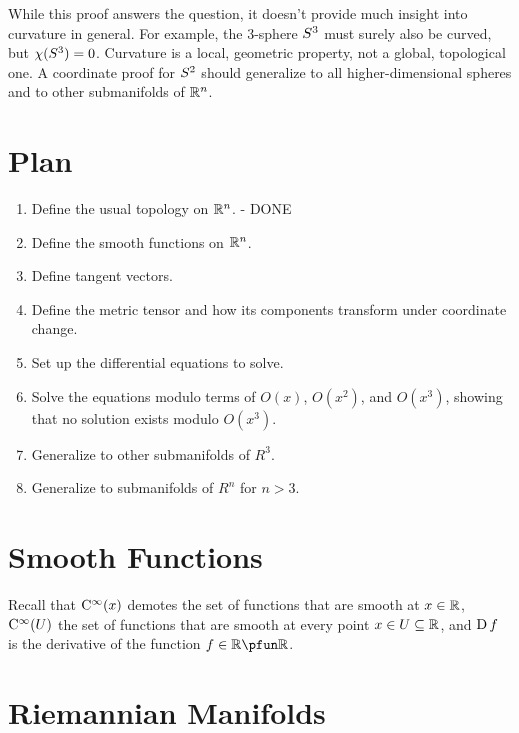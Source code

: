 \documentclass[11pt, oneside]{article}
\begin{document}
While this proof answers the question, it doesn't provide much insight into curvature in general.
For example, the 3-sphere $S^3$ must surely also be curved, but $\chi(S^3) = 0$.
Curvature is a local, geometric property, not a global, topological one.
A coordinate proof for $S^2$ should generalize to all higher-dimensional spheres and to other submanifolds of $\mathbb{R}^n$.

\section{Plan}

\begin{enumerate}

\item Define the usual topology on $\mathbb{R}^n$. - DONE

\item Define the smooth functions on $\mathbb{R}^n$.

\item Define tangent vectors.

\item Define the metric tensor and how its components transform under coordinate change.

\item Set up the differential equations to solve.

\item Solve the equations modulo terms of $O(x)$, $O(x^2)$, and $O(x^3)$, showing that no solution exists
modulo $O(x^3)$.

\item Generalize to other submanifolds of $R^3$.

\item Generalize to submanifolds of $R^n$ for $n > 3$.

\end{enumerate}

\section{Smooth Functions}

Recall that $\operatorname{C^{\infty}}(x)$ demotes the set of functions that are smooth at $x \in \mathbb{R}$, $\operatorname{C^{\infty}}(U)$ the set of functions that are smooth at
every point $x \in U \subseteq \mathbb{R}$, and $\operatorname{D} f$ is the derivative of the function $f \in \R \pfun \R$.

\section{Riemannian Manifolds}
\end{document}
